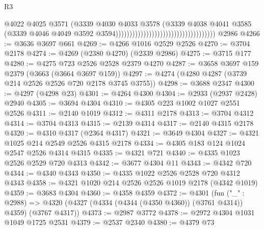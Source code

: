 \begin{lexlean}{R3}
\begin{coremodule}
                                                                      @4022
                                                                      @4025
                                                                      @3571
                                                                      (@3339
                                                                        @4030
                                                                        @4033
                                                                        @3578
                                                                        (@3339
                                                                          @4038
                                                                          @4041
                                                                          @3585
                                                                          (@3339
                                                                            @4046
                                                                            @4049
                                                                            @3592
                                                                            @3594))))))))))))))))))))))))))))))))))))
    @2986
@4266 := @3636 @3697 @661
@4269 := @4266 @1016 @2529 @2526
@4270 := @3704 @2178
@4274 := @4269 (@2380 @4270) (@2339 @2986)
@4275 := @3715 @177
@4280 := @4275 @723 @2526 @2528 @2379 @4270
@4287 := @3658 @3697 @159 @2379 (@3663 (@3664 @3697 @159))
@4297 := @4274 (@4280 @4287 (@3739 @214 @2526 @2526 @720 @2178 @3745 @3755))
@4298 := @3688 @2347
@4300 := @4297 (@4298 @23)
@4301 := @4264 @4300
@4304 := @2933 (@2937 @2428) @2940
@4305 := @3694 @4304
@4310 := @4305 @223 @1002 @1027 @2551 @2526
@4311 := @2140 @1019
@4312 := @4311 @2178
@4313 := @3704 @4312
@4314 := @3704 @4313
@4315 := @2139 @4314
@4317 := @2140 @4315 @2178
@4320 := @4310 @4317 (@2364 @4317)
@4321 := @3649 @4304
@4327 := @4321 @1025 @214 @2549 @2526 @4315 @2178
@4334 := @4305 @183 @124 @1024 @2547 @2526 @4314 @4315
@4335 := @4321 @721
@4340 := @4335 @1023 @2526 @2529 @720 @4313
@4342 := @3677 @4304 @11
@4343 := @4342 @720
@4344 := @4340 @4343
@4350 := @4335 @1022 @2526 @2528 @720 @4312 @4343
@4358 := @4321 @1020 @214 @2526 @2526 @1019 @2178 (@4342 @1019)
@4359 := @3683 @4304
@4360 := @4358 @4359
@4372 := @4301
    (fun ("_" : @2988) =>
    @4320 (@4327 (@4334 (@4344 (@4350 @4360)) (@3761 @4314)) @4359) (@3767 @4317))
@4373 := @2987 @3772
@4378 := @2972 @4304 @1031 @1049 @1725 @2531
@4379 := @2537 @2340
@4380 := @4379 @73

\end{coremodule}
\end{lexlean}
